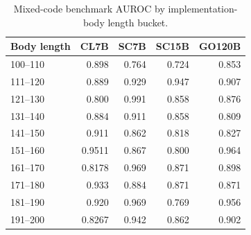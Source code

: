 \begin{table}[t]
\centering\scriptsize
\caption{Mixed-code benchmark AUROC by implementation-body length bucket.}
\label{tab:mixedcode-auroc-by-bucket}
\begin{tabular}{lrrrr}
\toprule
Body length 
         & CL7B   & SC7B & SC15B & GO120B \\
\midrule
100--110 & 0.898  & 0.764 & 0.724 & 0.853 \\
111--120 & 0.889  & 0.929 & 0.947 & 0.907 \\
121--130 & 0.800  & 0.991 & 0.858 & 0.876 \\
131--140 & 0.884  & 0.911 & 0.858 & 0.809 \\
141--150 & 0.911  & 0.862 & 0.818 & 0.827 \\
151--160 & 0.9511 & 0.867 & 0.800 & 0.964 \\
161--170 & 0.8178 & 0.969 & 0.871 & 0.898 \\
171--180 & 0.933  & 0.884 & 0.871 & 0.871 \\
181--190 & 0.920  & 0.969 & 0.769 & 0.956 \\
191--200 & 0.8267 & 0.942 & 0.862 & 0.902 \\
\bottomrule
\end{tabular}
\end{table}
